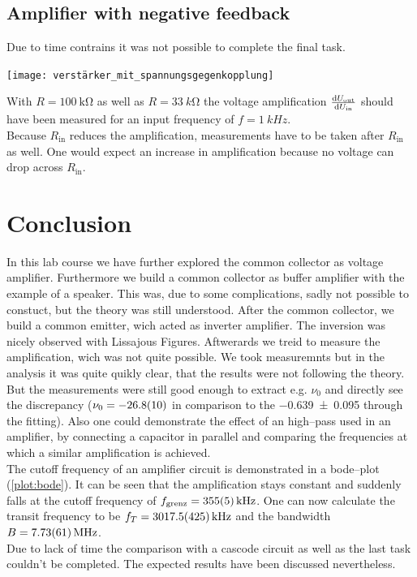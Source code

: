 \documentclass[a4paper,10pt]{article}
\newenvironment{Figure}
  {\par\medskip\noindent\minipage{\linewidth}}
  {\endminipage\par\medskip} %
\numberwithin{equation}{section}
\begin{document}
\begin{multicols}{2}
	\subsection{Amplifier with negative feedback}
	Due to time contrains it was not possible to complete the final task.
	\begin{Figure}
		\centering
		\texttt{[image: verstärker\_mit\_spannungsgegenkopplung]}
	\end{Figure}
	With $R=\SI{100}{\kilo\ohm}$ as well as $R=\SI{33}{k\ohm}$ the voltage amplification $\diff[]{U_\text{out}}{U_\text{in}}$ should have been measured for an input frequency of $f=\SI{1}{kHz}$.
	\\\indent Because $R_\text{in}$ reduces the amplification, measurements have to be taken after $R_\text{in}$ as well.
	One would expect an increase in amplification because no voltage can drop across $R_\text{in}$.

	\section{Conclusion}
  In this lab course we have further explored the common collector as voltage amplifier. Furthermore we build a common collector as buffer amplifier with the example of a speaker. This was, due to some complications, sadly not possible to constuct, but the theory was still understood. After the common collector, we build a common emitter, wich acted as inverter amplifier. The inversion was nicely observed with Lissajous Figures. Aftwerards we treid to measure the amplification, wich was not quite possible. We took measuremnts but in the analysis it was quite quikly clear, that the results were not following the theory. But the measurements were still good enough to extract e.g. $\nu_0$ and directly see the discrepancy ($\nu_0=\SI{-26.8+-1.0}{}$ in comparison to the \SI{-0.639+-0.095}{} through the fitting). Also one could demonstrate the effect of an high--pass used in an amplifier, by connecting a capacitor in parallel and comparing the frequencies at which a similar amplification is achieved.
	\\\indent The cutoff frequency of an amplifier circuit is demonstrated in a bode--plot (\ref{plot:bode}).
	It can be seen that the amplification stays constant and suddenly falls at the cutoff frequency of $f_\text{grenz}=\SI{355+-5}{kHz}$.
	One can now calculate the transit frequency to be $f_T=\SI{3017.5+-42.5}{kHz}$ and the bandwidth $B=\SI{7.73+-0.61}{MHz}$.
	\\\indent Due to lack of time the comparison with a cascode circuit as well as the last task couldn't be completed.
	The expected results have been discussed nevertheless.

\end{multicols}

\clearpage
\listoffigures
\listoftables



\end{document}
